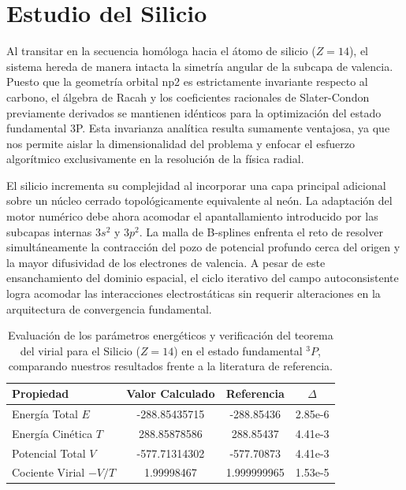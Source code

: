 \documentclass[12pt,a4paper]{book}
\begin{document}
\newpage

\section{Estudio del Silicio}

Al transitar en la secuencia homóloga hacia el átomo de silicio ($Z=14$), el sistema hereda de manera intacta la simetría angular de la subcapa de valencia. Puesto que la geometría orbital np2 es estrictamente invariante respecto al carbono, el álgebra de Racah y los coeficientes racionales de Slater-Condon previamente derivados se mantienen idénticos para la optimización del estado fundamental 3P. Esta invarianza analítica resulta sumamente ventajosa, ya que nos permite aislar la dimensionalidad del problema y enfocar el esfuerzo algorítmico exclusivamente en la resolución de la física radial.

El silicio incrementa su complejidad al incorporar una capa principal adicional sobre un núcleo cerrado topológicamente equivalente al neón. La adaptación del motor numérico debe ahora acomodar el apantallamiento introducido por las subcapas internas $3s^2$ y $3p^2$. La malla de B-splines enfrenta el reto de resolver simultáneamente la contracción del pozo de potencial profundo cerca del origen y la mayor difusividad de los electrones de valencia. A pesar de este ensanchamiento del dominio espacial, el ciclo iterativo del campo autoconsistente logra acomodar las interacciones electrostáticas sin requerir alteraciones en la arquitectura de convergencia fundamental.

\begin{table}[htbp]
    \centering
    \caption{Evaluación de los parámetros energéticos y verificación del teorema del virial para el Silicio ($Z=14$) en el estado fundamental $^{3}P$, comparando nuestros resultados frente a la literatura de referencia.}
    \label{tab:resultados_energia}
    \begin{tabular}{
        l
        S[table-format=-4.8]
        S[table-format=-4.8]
        S[table-format=1.2e-1]
    }
        \toprule
        {\textbf{Propiedad}} & {\textbf{Valor Calculado}} & {\textbf{Referencia}} & {$\Delta$} \\
        \midrule
        Energía Total $E$ & -288.85435715 & -288.85436 & 2.85e-6 \\
        Energía Cinética $T$ & 288.85878586 & 288.85437 & 4.41e-3 \\
        Potencial Total $V$ & -577.71314302 & -577.70873 & 4.41e-3 \\
        Cociente Virial $-V/T$ & 1.99998467 & 1.999999965 & 1.53e-5 \\
        \bottomrule
    \end{tabular}
\end{table}
\end{document}

